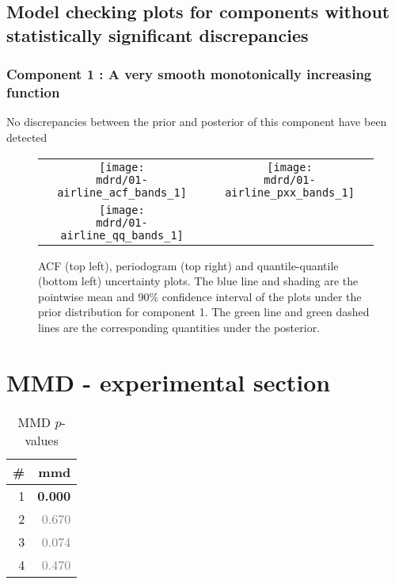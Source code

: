 \documentclass{article} %
\begin{document}
\subsection{Model checking plots for components without statistically significant discrepancies}

\subsubsection{Component 1 : A very smooth monotonically increasing function}

No discrepancies between the prior and posterior of this component have been detected

\begin{figure}[H]
\newcommand{\wmgd}{0.5\columnwidth}
\newcommand{\hmgd}{3.0cm}
\newcommand{\mdrd}{01-airline}
\newcommand{\mbm}{\hspace{-0.3cm}}
\begin{tabular}{cc}
\mbm \texttt{[image: \\mdrd/01-airline\_acf\_bands\_1]} & \texttt{[image: \\mdrd/01-airline\_pxx\_bands\_1]} \\
\mbm \texttt{[image: \\mdrd/01-airline\_qq\_bands\_1]}
\end{tabular}
\caption{
ACF (top left), periodogram (top right) and quantile-quantile (bottom left) uncertainty plots.
The blue line and shading are the pointwise mean and 90\% confidence interval of the plots under the prior distribution for component 1.
The green line and green dashed lines are the corresponding quantities under the posterior.}
\label{fig:check1}
\end{figure}

\section{MMD - experimental section}
\label{sec:mmd}

\begin{table}[htb]
\begin{center}
{\small
\begin{tabular}{|r|r|}
\hline
\bf{\#} & {mmd}\\
\hline

1 & \textbf{0.000}\\

2 & \textcolor{gray}{0.670}\\

3 & \textcolor{gray}{0.074}\\

4 & \textcolor{gray}{0.470}\\

\hline
\end{tabular}
\caption{
MMD $p$-values
}
\label{table:mmd}
}
\end{center}
\end{table}
\end{document}
